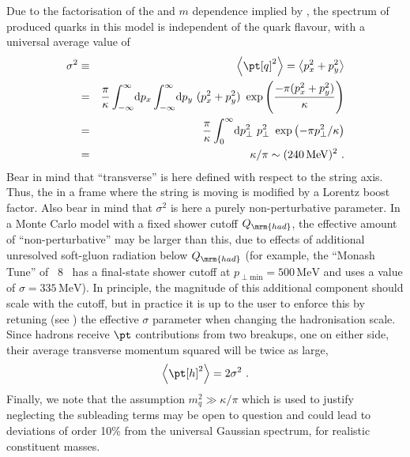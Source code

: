 %
Due to the factorisation of the \pt and $m$ dependence
implied by , the \pt spectrum of produced
quarks in this model is independent of the quark flavour, with a
universal average value of 
\begin{eqnarray}
\sigma^2 & \equiv & \left<\pt[q]^2\right> =  \left< p_x^2 + p_y^2\right> \\
& = & \frac{\pi}{\kappa}\int_{-\infty}^{\infty} \!\mathrm{d}p_x \int_{-\infty}^{\infty}
      \!\mathrm{d}p_y \ (p_x^2 + p_y^2) \ \exp\left(\frac{-\pi(p_x^2 +
      p_y^2)}{\kappa}\right) \\ 
& = & \frac{\pi}{\kappa} \int_0^\infty \! \mathrm{d}p_\perp^2 \
      p_\perp^2 \ 
\exp\left(-\pi p_\perp^2/ \kappa\right) \\ 
& = & \kappa/\pi \sim
(240\,\mbox{MeV})^2~. 
\end{eqnarray}
Bear in mind that ``transverse'' is here defined
with respect to the string axis.  Thus, the
\pt in a frame where the string is moving is modified by a Lorentz
boost factor. Also bear in mind that $\sigma^2$ is here 
a purely non-perturbative parameter. 
\index{Hadronisation scale}%
In a Monte Carlo model
with a fixed shower cutoff $Q_\mrm{had}$, 
the effective amount of ``non-perturbative'' \pt 
may be larger than this,  due to effects of additional unresolved
soft-gluon radiation below $Q_\mrm{had}$ (for example, the ``Monash
Tune'' of \Py~8~\cite{Skands:2014pea} has a final-state shower cutoff
at $p_{\perp\mathrm{min}} = 500\, \mathrm{MeV}$ and uses a value of
$\sigma = 335\,\mbox{MeV}$). 
\index{String model}%
%
In principle, the magnitude of this additional component 
should scale with the cutoff, but in practice it is up to
the user to enforce this by retuning (see ) 
the effective $\sigma$ parameter 
when changing the hadronisation scale. Since hadrons
receive $\pt$ contributions from two breakups, one on either side, 
their average transverse momentum squared will be twice as large,
\begin{equation}
\left<\pt[h]^2\right> = 2\sigma^2~. 
\end{equation}
Finally, we note that the assumption $m_q^2 \gg \kappa/\pi$ which is used to justify neglecting the subleading terms  may be open to question and could lead to deviations of order 10\% from the universal Gaussian spectrum, for realistic constituent masses. 

